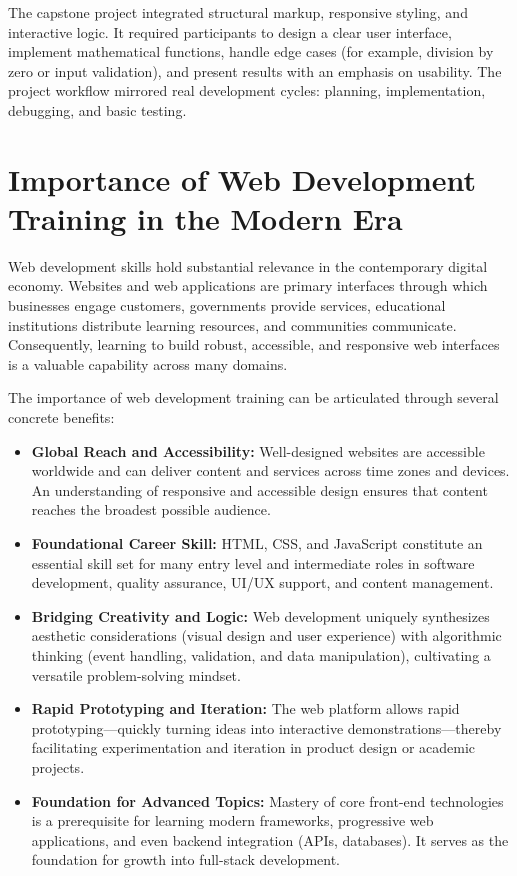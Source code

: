 \documentclass[a4paper,12pt,oneside]{report}
\numberwithin{equation}{chapter}
\numberwithin{figure}{chapter}
\numberwithin{table}{chapter}
\begin{document}
The capstone project integrated structural markup, responsive styling, and interactive logic. It required participants to design a clear user interface, implement mathematical functions, handle edge cases (for example, division by zero or input validation), and present results with an emphasis on usability. The project workflow mirrored real development cycles: planning, implementation, debugging, and basic testing.

\section{Importance of Web Development Training in the Modern Era}

Web development skills hold substantial relevance in the contemporary digital economy. Websites and web applications are primary interfaces through which businesses engage customers, governments provide services, educational institutions distribute learning resources, and communities communicate. Consequently, learning to build robust, accessible, and responsive web interfaces is a valuable capability across many domains.

The importance of web development training can be articulated through several concrete benefits:

\begin{itemize}
    \item \textbf{Global Reach and Accessibility:} Well-designed websites are accessible worldwide and can deliver content and services across time zones and devices. An understanding of responsive and accessible design ensures that content reaches the broadest possible audience.
    \item \textbf{Foundational Career Skill:} HTML, CSS, and JavaScript constitute an essential skill set for many entry level and intermediate roles in software development, quality assurance, UI/UX support, and content management.
    \item \textbf{Bridging Creativity and Logic:} Web development uniquely synthesizes aesthetic considerations (visual design and user experience) with algorithmic thinking (event handling, validation, and data manipulation), cultivating a versatile problem-solving mindset.
    \item \textbf{Rapid Prototyping and Iteration:} The web platform allows rapid prototyping—quickly turning ideas into interactive demonstrations—thereby facilitating experimentation and iteration in product design or academic projects.
    \item \textbf{Foundation for Advanced Topics:} Mastery of core front-end technologies is a prerequisite for learning modern frameworks, progressive web applications, and even backend integration (APIs, databases). It serves as the foundation for growth into full-stack development.
\end{itemize}
\end{document}
